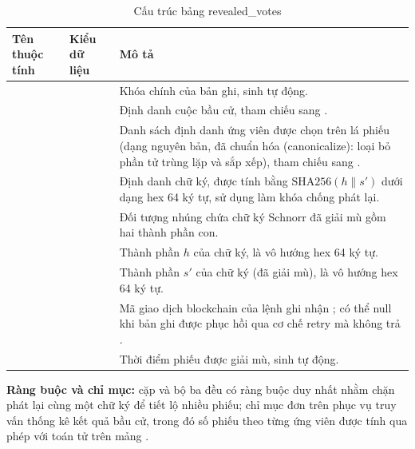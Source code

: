 \begin{table}[H]
    \centering
    \small
    \setlength{\tabcolsep}{3pt}
    \caption{Cấu trúc bảng {revealed\_votes}}
    \label{tab:db-revealed-votes}
    \begin{tabularx}{\textwidth}{|L{0.25}|L{0.25}|L{0.50}|}
    \hline
    \textbf{Tên thuộc tính} & \textbf{Kiểu dữ liệu} & \textbf{Mô tả} \\
    \hline
                &  & Khóa chính của bản ghi, sinh tự động. \\ \hline
        &  & Định danh cuộc bầu cử, tham chiếu sang . \\ \hline
      &  & Danh sách định danh ứng viên được chọn trên lá phiếu (dạng nguyên bản, đã chuẩn hóa (canonicalize): loại bỏ phần tử trùng lặp và sắp xếp), tham chiếu sang . \\ \hline
         &    & Định danh chữ ký, được tính bằng $\mathrm{SHA256}(h \mathbin{\|} s')$ dưới dạng hex 64 ký tự, sử dụng làm khóa chống phát lại. \\ \hline
         & \allowbreak{}\allowbreak{} & Đối tượng nhúng chứa chữ ký Schnorr đã giải mù gồm hai thành phần con. \\ \hline
       &    & Thành phần $h$ của chữ ký, là vô hướng hex 64 ký tự. \\ \hline
     &  & Thành phần $s'$ của chữ ký (đã giải mù), là vô hướng hex 64 ký tự. \\ \hline
     &   & Mã giao dịch blockchain của lệnh ghi nhận ; có thể null khi bản ghi được phục hồi qua cơ chế retry mà  không trả . \\ \hline
        &  & Thời điểm phiếu được giải mù, sinh tự động. \\ \hline
    \end{tabularx}
\end{table}

\textbf{Ràng buộc và chỉ mục:} cặp  và bộ ba  đều có ràng buộc duy nhất nhằm chặn phát lại cùng một chữ ký để tiết lộ nhiều phiếu; chỉ mục đơn trên  phục vụ truy vấn thống kê kết quả bầu cử, trong đó số phiếu theo từng ứng viên được tính qua phép  với toán tử  trên mảng .
